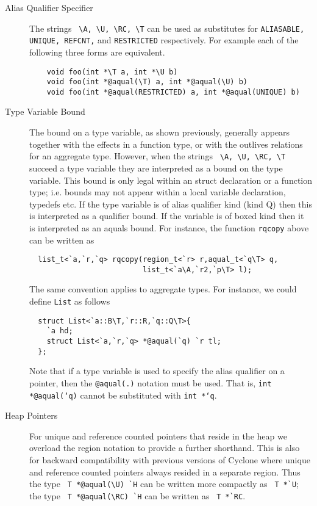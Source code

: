 \begin{description}
\item[Alias Qualifier Specifier] The strings \verb+ \A, \U, \RC, \T+
  can be used as substitutes for {\tt ALIASABLE, UNIQUE, REFCNT,} and
  {\tt RESTRICTED} respectively. For example each of the following
  three forms are equivalent.
  \begin{verbatim}
    void foo(int *\T a, int *\U b)
    void foo(int *@aqual(\T) a, int *@aqual(\U) b)
    void foo(int *@aqual(RESTRICTED) a, int *@aqual(UNIQUE) b)
  \end{verbatim} 
  
\item[Type Variable Bound] The bound on a type variable, as shown
  previously, generally appears together with the effects in a
  function type, or with the outlives relations for an aggregate
  type. However, when the strings \verb+ \A, \U, \RC, \T+ succeed a
  type variable they are interpreted as a bound on the type
  variable. This bound is only legal within an struct declaration or a
  function type; i.e. bounds may not appear within a local variable
  declaration, typedefs etc. If the type variable is of alias
  qualifier kind (kind Q) then this is interpreted as a qualifier
  bound. If the variable is of boxed kind then it is interpreted as an
  aquals bound. For instance, the function {\tt rqcopy} above can be
  written as
  
  \begin{verbatim}
  list_t<`a,`r,`q> rqcopy(region_t<`r> r,aqual_t<`q\T> q,
                          list_t<`a\A,`r2,`p\T> l);
  \end{verbatim}
  
  The same convention applies to aggregate types. For instance, we
  could define {\tt List} as follows

  \begin{verbatim}
  struct List<`a::B\T,`r::R,`q::Q\T>{ 
    `a hd; 
    struct List<`a,`r,`q> *@aqual(`q) `r tl;
  };
  \end{verbatim}

  Note that if a type variable is used to specify the alias qualifier
  on a pointer, then the \texttt{@aqual(.)} notation must be
  used. That is, \texttt{int *@aqual(`q\T)} cannot be substituted with
  \texttt{int *`q\T}. 

\item[Heap Pointers] For unique and reference counted pointers that
  reside in the heap we overload the region notation to provide a
  further shorthand. This is also for backward compatibility with
  previous versions of Cyclone where unique and reference counted
  pointers always resided in a separate region. Thus the type
  \verb+ T *@aqual(\U) `H+ can be written more compactly as
  \verb+ T *`U+; the type \verb+ T *@aqual(\RC) `H+ can be written as
  \verb+ T *`RC+.

\end{description}

